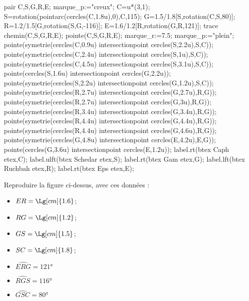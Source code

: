 \begin{exercice*}
    \begin{Geometrie}
        pair C,S,G,R,E;
        marque_p:="creux";
        C=u*(3,1);
        S=rotation(pointarc(cercles(C,1.8u),0),C,115);
        G=1.5/1.8[S,rotation(C,S,80)];
        R=1.2/1.5[G,rotation(S,G,-116)];
        E=1.6/1.2[R,rotation(G,R,121)];
        trace chemin(C,S,G,R,E);
        pointe(C,S,G,R,E);
        marque_r:=7.5;
        marque_p:="plein";
        pointe(symetrie(cercles(C,0.9u) intersectionpoint cercles(S,2.2u),S,C));
        pointe(symetrie(cercles(C,2.4u) intersectionpoint cercles(S,1u),S,C));
        pointe(symetrie(cercles(C,4.5u) intersectionpoint cercles(S,3.1u),S,C));
        pointe(cercles(S,1.6u) intersectionpoint cercles(G,2.2u));
        pointe(symetrie(cercles(S,2.2u) intersectionpoint cercles(G,1.2u),S,C));
        pointe(symetrie(cercles(R,2.7u) intersectionpoint cercles(G,2.7u),R,G));
        pointe(symetrie(cercles(R,2.7u) intersectionpoint cercles(G,3u),R,G));
        pointe(symetrie(cercles(R,3.4u) intersectionpoint cercles(G,3.4u),R,G));
        pointe(symetrie(cercles(R,4.4u) intersectionpoint cercles(G,4.4u),R,G));
        pointe(symetrie(cercles(R,4.4u) intersectionpoint cercles(G,4.6u),R,G));
        pointe(symetrie(cercles(G,4.8u) intersectionpoint cercles(E,4.2u),E,G));
        pointe(cercles(G,3.6u) intersectionpoint cercles(E,1.2u));
        label.rt(btex Caph etex,C);
        label.ulft(btex Schedar etex,S);
        label.rt(btex Gam etex,G);
        label.lft(btex Ruchbah etex,R);
        label.rt(btex Eps etex,E);
    \end{Geometrie}
    Reproduire la figure ci-dessus, avec ces données :
    \begin{multicols}{2}
        \begin{itemize}
            \item $ER=\Lg[cm]{1.6}$;
            \item $RG=\Lg[cm]{1.2}$;
            \item $GS=\Lg[cm]{1.5}$;
            \item $SC=\Lg[cm]{1.8}$;
            \item $\widehat{ERG}=\ang{121}$
            \item $\widehat{RGS}=\ang{116}$
            \item $\widehat{GSC}=\ang{80}$
        \end{itemize}
    \end{multicols}
\end{exercice*}